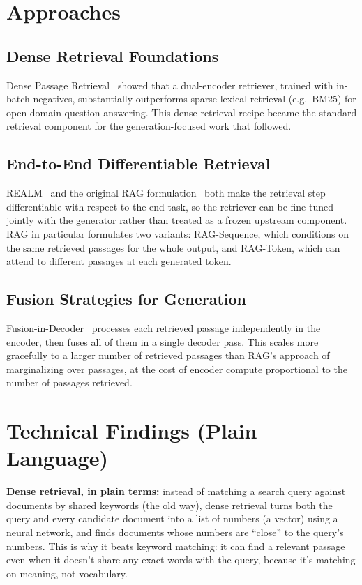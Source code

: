 \documentclass[11pt]{article}
\begin{document}
\section{Approaches}

\subsection{Dense Retrieval Foundations}
Dense Passage Retrieval~\citep{karpukhin2020dpr} showed that a dual-encoder retriever,
trained with in-batch negatives, substantially outperforms sparse lexical retrieval
(e.g.\ BM25) for open-domain question answering. This dense-retrieval recipe became the
standard retrieval component for the generation-focused work that followed.

\subsection{End-to-End Differentiable Retrieval}
REALM~\citep{guu2020realm} and the original RAG
formulation~\citep{lewis2020rag} both make the retrieval step differentiable with
respect to the end task, so the retriever can be fine-tuned jointly with the generator
rather than treated as a frozen upstream component.
RAG in particular formulates two variants: RAG-Sequence, which conditions on the same
retrieved passages for the whole output, and RAG-Token, which can attend to different
passages at each generated token.

\subsection{Fusion Strategies for Generation}
Fusion-in-Decoder~\citep{izacard2021fid} processes each retrieved passage
independently in the encoder, then fuses all of them in a single decoder pass. This
scales more gracefully to a larger number of retrieved passages than RAG's approach of
marginalizing over passages, at the cost of encoder compute proportional to the number
of passages retrieved.

\section{Technical Findings (Plain Language)}
\textbf{Dense retrieval, in plain terms:} instead of matching a search query against
documents by shared keywords (the old way), dense retrieval turns both the query and
every candidate document into a list of numbers (a vector) using a neural network, and
finds documents whose numbers are ``close'' to the query's numbers. This is why it
beats keyword matching: it can find a relevant passage even when it doesn't share any
exact words with the query, because it's matching on meaning, not vocabulary.
\end{document}
